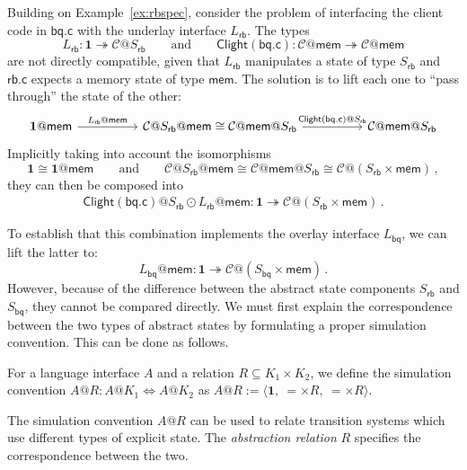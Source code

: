 \documentclass[acmsmall,screen,review,anonymous]{acmart}
\newcommand{\kw}[1]{\ensuremath{ \mathsf{#1} }}
\begin{document}
\begin{example}[Interfacing $L_\kw{rb}$ with client code]
Building on Example~\ref{ex:rbspec},
consider the problem of interfacing
the client code in $\kw{bq.c}$ with the underlay interface $L_\kw{rb}$.
The types
\[
  L_\kw{rb} : \mathbf{1} \twoheadrightarrow \mathcal{C}@S_\kw{rb}
  \qquad
  \text{and}
  \qquad
  \kw{Clight}(\kw{bq.c}) : \mathcal{C}@\kw{mem} \twoheadrightarrow \mathcal{C}@\kw{mem}
\]
are not directly compatible,
given that $L_\kw{rb}$ manipulates a state of type $S_\kw{rb}$
and $\kw{rb.c}$ expects a memory state of type $\kw{mem}$.
The solution is to lift each one to ``pass through''
the state of the other:
\[
  \begin{tikzcd}[column sep=huge]
    \mathbf{1}@\kw{mem}
    \ar[r, "L_\kw{rb}@\kw{mem}"] &
    \mathcal{C}@S_\kw{rb}@\kw{mem} \cong
    \mathcal{C}@\kw{mem}@S_\kw{rb}
    \ar[r, "\kw{Clight}(\kw{bq.c})@S_\kw{rb}"] &
    \mathcal{C}@\kw{mem}@S_\kw{rb}
  \end{tikzcd}
\]
Implicitly taking into account the isomorphisms
\[
  \mathbf{1} \cong \mathbf{1}@\kw{mem}
  \qquad
  \text{and}
  \qquad
  \mathcal{C}@S_\kw{rb}@\kw{mem} \cong
  \mathcal{C}@\kw{mem}@S_\kw{rb} \cong
  \mathcal{C}@(S_\kw{rb} \times \kw{mem})
  \,,
\]
they can then be composed into
\begin{gather*}
  \kw{Clight}(\kw{bq.c})@S_\kw{rb} \odot
  L_\kw{rb}@\kw{mem} :
  \mathbf{1} \twoheadrightarrow \mathcal{C}@(S_\kw{rb} \times \kw{mem})
  \,.
\end{gather*}

To establish that this combination implements the overlay interface $L_\kw{bq}$,
we can lift the latter to:
\[
  L_\kw{bq}@\kw{mem} : \mathbf{1} \twoheadrightarrow
    \mathcal{C}@(S_\kw{bq} \times \kw{mem})
  \,.
\]
However,
because of the difference between
the abstract state components $S_\kw{rb}$ and $S_\kw{bq}$,
they cannot be compared directly.
We must first explain the correspondence between
the two types of abstract states
by formulating a proper simulation convention.
This can be done as follows.
\end{example}

\begin{definition}
For a language interface $A$ and a relation $R \subseteq K_1 \times K_2$,
we define the simulation convention $A@R : A@K_1 \Leftrightarrow A@K_2$ as
$
  A@R := \langle \mathbf{1}, \: {=} \times R, \: {=} \times R \rangle
$.
\end{definition}

The simulation convention $A@R$
can be used to relate transition systems which use
different types of explicit state.
The \emph{abstraction relation} $R$
specifies the correspondence between the two.
\end{document}
